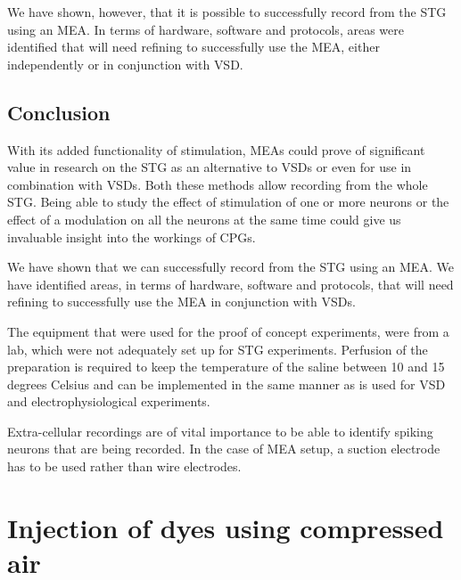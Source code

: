 We have shown, however, that it is possible to successfully record from the \ac{STG} using an \ac{MEA}. In terms of hardware, software and protocols, areas were identified that will need refining to successfully use the \ac{MEA}, either independently or in conjunction with \ac{VSD}.



\subsection{Conclusion}
With its added functionality of stimulation, \acp{MEA} could prove of significant value in research on the \ac{STG} as an alternative to \acp{VSD} or even for use in combination with \acp{VSD}. Both these methods allow recording from the whole \ac{STG}. Being able to study the effect of stimulation of one or more neurons or the effect of a modulation on all the neurons at the same time could give us invaluable insight into the workings of \acp{CPG}.

We have shown that we can successfully record from the \ac{STG} using an \ac{MEA}. We have identified areas, in terms of hardware, software and protocols, that will need refining to successfully use the \ac{MEA} in conjunction with \acp{VSD}. 

The equipment that were used for the proof of concept experiments, were from a  lab, which were not adequately set up for \ac{STG} experiments. Perfusion of the preparation is required to keep the temperature of the saline between 10 and 15 degrees Celsius and can be implemented in the same manner as is used for \ac{VSD} and electrophysiological experiments.

Extra-cellular recordings are of vital importance to be able to identify spiking neurons that are being recorded. In the case of \ac{MEA} setup, a suction electrode has to be used rather than wire electrodes.


\section{Injection of dyes using compressed air}
